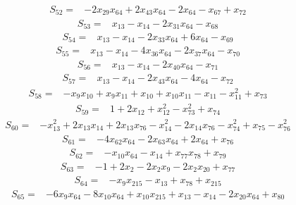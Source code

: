 \begin{align*}
S_{52}={}&-2x_{29}x_{64}+2x_{43}x_{64}-2x_{64}-x_{67}+x_{72}
\end{align*}
\begin{align*}
S_{53}={}&x_{13}-x_{14}-2x_{31}x_{64}-x_{68}
\end{align*}
\begin{align*}
S_{54}={}&x_{13}-x_{14}-2x_{33}x_{64}+6x_{64}-x_{69}
\end{align*}
\begin{align*}
S_{55}={}&x_{13}-x_{14}-4x_{36}x_{64}-2x_{37}x_{64}-x_{70}
\end{align*}
\begin{align*}
S_{56}={}&x_{13}-x_{14}-2x_{40}x_{64}-x_{71}
\end{align*}
\begin{align*}
S_{57}={}&x_{13}-x_{14}-2x_{43}x_{64}-4x_{64}-x_{72}
\end{align*}
\begin{align*}
S_{58}={}&-x_{9}x_{10}+x_{9}x_{11}+x_{10}+x_{10}x_{11}-x_{11}-x_{11}^{2}+x_{73}
\end{align*}
\begin{align*}
S_{59}={}&1+2x_{12}+x_{12}^{2}-x_{73}^{2}+x_{74}
\end{align*}
\begin{align*}
S_{60}={}&-x_{13}^{2}+2x_{13}x_{14}+2x_{13}x_{76}-x_{14}^{2}-2x_{14}x_{76}-x_{74}^{2}+x_{75}-x_{76}^{2}
\end{align*}
\begin{align*}
S_{61}={}&-4x_{62}x_{64}-2x_{63}x_{64}+2x_{64}+x_{76}
\end{align*}
\begin{align*}
S_{62}={}&-x_{10}x_{64}-x_{14}+x_{77}x_{78}+x_{79}
\end{align*}
\begin{align*}
S_{63}={}&-1+2x_{2}-2x_{2}x_{9}-2x_{2}x_{20}+x_{77}
\end{align*}
\begin{align*}
S_{64}={}&-x_{9}x_{215}-x_{13}+x_{78}+x_{215}
\end{align*}
\begin{align*}
S_{65}={}&-6x_{9}x_{64}-8x_{10}x_{64}+x_{10}x_{215}+x_{13}-x_{14}-2x_{20}x_{64}+x_{80}
\end{align*}
